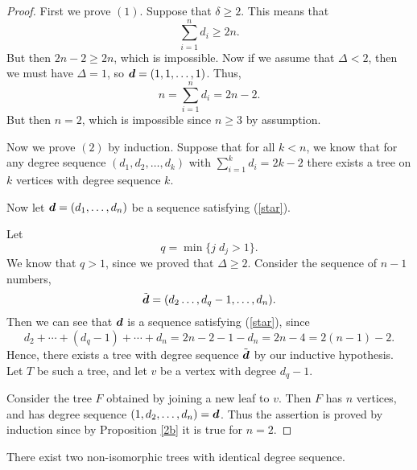 \documentclass{unswmaths}
\begin{document}
\begin{proof}
    First we prove $(1)$. Suppose that $\delta \geq 2$. This means that
    \begin{equation}
        \sum_{i=1}^n d_i \geq 2n.
    \end{equation}
    But then $2n-2 \geq 2n$, which is impossible. Now if we assume that $\Delta < 2$,
    then we must have $\Delta = 1$, so $\boldsymbol{d} = (1,1,\ldots,1)$. Thus,
    \begin{equation}
        n = \sum_{i=1}^n d_i = 2n-2.
    \end{equation}
    But then $n = 2$, which is impossible since $n \geq 3$ by assumption.
    
    Now we prove $(2)$ by induction. Suppose that for all $k < n$, we know
    that for any degree sequence $(d_1,d_2,\ldots,d_k)$ with $\sum_{i=1}^k d_i = 2k-2$
    there exists a tree on $k$ vertices with degree sequence $k$.
    
    Now let $\boldsymbol{d} = (d_1,\ldots,d_n)$ be a sequence satisfying (\ref{star}).
    
    Let
    \begin{equation}
        q = \min\{ j \; d_j > 1\}.
    \end{equation}
    We know that $q > 1$, since we proved that $\Delta \geq 2$. Consider
    the sequence of $n-1$ numbers,
    \begin{equation}
        \tilde{\boldsymbol{d}} = (d_2\ldots,d_q-1,\ldots,d_n).
    \end{equation}
    Then we can see that $\boldsymbol{d}$ is a sequence satisfying (\ref{star}), since
    \begin{equation}
        d_2+\cdots+(d_q-1) + \cdots + d_n = 2n-2-1-d_n = 2n-4 = 2(n-1) - 2.
    \end{equation}  
    Hence, there exists a tree with degree sequence $\tilde{\boldsymbol{d}}$ by our inductive
    hypothesis. Let $T$ be such a tree, and let $v$ be a vertex
    with degree $d_q - 1$. 
    
    Consider the tree $F$ obtained by joining a new leaf to $v$. Then $F$
    has $n$ vertices, and has degree sequence $(1,d_2,\ldots,d_n) = \boldsymbol{d}$.
    Thus the assertion is proved by induction since by Proposition \ref{2b} it is true for $n=2$.
\end{proof}
\begin{proposition}
\label{2d}
    There exist two non-isomorphic trees with identical degree sequence.
\end{proposition}
\end{document}
